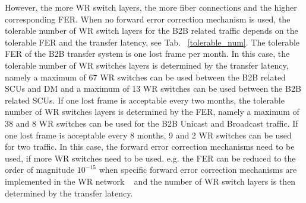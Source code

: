 However, the more WR switch layers, the more fiber connections and the higher corresponding FER. When no forward error correction mechanism is used, the tolerable number of WR switch layers for the B2B related traffic depends on the tolerable FER and the transfer latency, see Tab. ~\ref{tolerable_num}. The tolerable FER of the B2B transfer system is one lost frame per month. In this case, the tolerable number of WR switches layers is determined by the transfer latency, namely a maximum of 67 WR switches can be used between the B2B related SCUs and DM and a maximum of 13 WR switches can be used between the B2B related SCUs. If one lost frame is acceptable every two months, the tolerable number of WR switches layers is determined by the FER, namely a maximum of 38 and 8 WR switches can be used for the B2B Unicast and Broadcast traffic. If one lost frame is acceptable every 8 months, 9 and 2 WR switches can be used for two traffic. In this case, the forward error correction mechanisms need to be used, if more WR switches need to be used. e.g. the FER can be reduced to the order of magnitude $10^{-15}$ when specific forward error correction mechanisms are implemented in the WR network ~\cite{prados_white_2011} and the number of WR switch layers is then determined by the transfer latency. 
